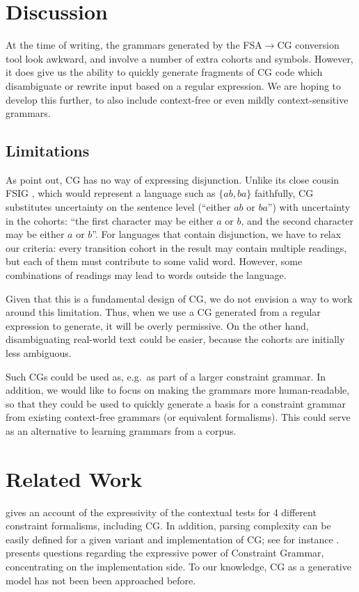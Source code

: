 \documentclass[11pt]{article}
\begin{document}
\section{Discussion}
At the time of writing, the grammars generated by the FSA$\rightarrow$CG
conversion tool look awkward, and involve a number of extra cohorts and symbols.
However, it does give us the ability to quickly generate fragments of CG code
which disambiguate or rewrite input based on a regular expression.
We are hoping to develop this further, to also include context-free or even
mildly context-sensitive grammars.


\subsection{Limitations}
As  point out, CG has no way of expressing disjunction.
Unlike its close cousin FSIG \cite{koskenniemi90}, which would represent a 
language such as $\{ab,ba\}$ faithfully, CG substitutes uncertainty on the 
sentence level (``either $ab$ or $ba$'') with uncertainty in the cohorts: 
``the first character may be either $a$ or $b$, and the second character 
may be either $a$ or $b$''.
For languages that contain disjunction, we have to relax our criteria:
every transition cohort in the result may contain multiple readings,
but each of them must contribute to some valid word. However, some
combinations of readings may lead to words outside the language.

Given that this is a fundamental design of CG, we do not envision a way to work
around this limitation. Thus, when we use a CG generated from a regular
expression to generate, it will be overly permissive. On the other
hand, disambiguating real-world text could be easier, because the
cohorts are initially less ambiguous.


Such CGs could be used as, e.g.\ as part of a larger constraint grammar.
In addition, we would like to focus on making the grammars more human-readable,
so that they could be used to quickly generate a basis for a constraint grammar
from existing context-free grammars (or equivalent formalisms).
This could serve as an alternative to learning grammars from a corpus.


\section{Related Work}
 gives an account of the expressivity of
the contextual tests for 4 different constraint formalisms, including CG. 
In addition, parsing complexity can be easily defined for a given variant and 
implementation of CG; see for instance .
 presents questions regarding the expressive power
of Constraint Grammar, concentrating on the implementation side.
To our knowledge, CG as a generative model has not been been approached before.



\end{document}
